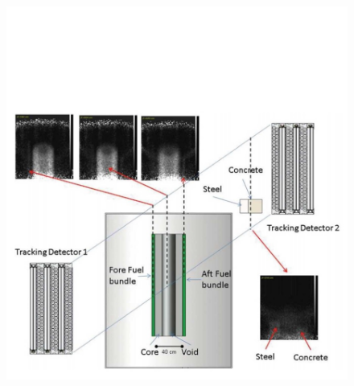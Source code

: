 \begin{figure}[!h]
\centering
\begin{minipage}{.45\textwidth}
  \centering
  \includegraphics[width=\linewidth]{Chapter5/Figs/MuTomographyExamples/Toshiba3dTomogarphy.jpg}
  \label{fig:Toshiba3dTomogarphy}
  \vspace{0.956cm} %
\end{minipage}%
\qquad
\begin{minipage}{.45\textwidth}
  \centering

\end{minipage}
\end{figure}
